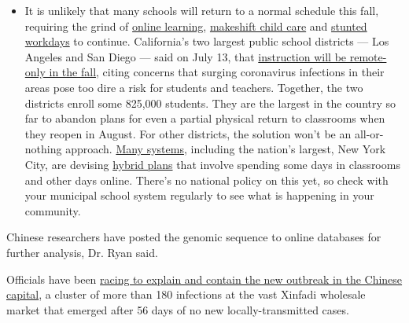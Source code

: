 \begin{itemize}
  \begin{itemize}
  \tightlist
  \item
    It is unlikely that many schools will return to a normal schedule
    this fall, requiring the grind of
    \href{https://www.nytimes3xbfgragh.onion/2020/06/05/us/coronavirus-education-lost-learning.html?action=click\&pgtype=Article\&state=default\&region=MAIN_CONTENT_3\&context=storylines_faq}{online
    learning},
    \href{https://www.nytimes3xbfgragh.onion/2020/05/29/us/coronavirus-child-care-centers.html?action=click\&pgtype=Article\&state=default\&region=MAIN_CONTENT_3\&context=storylines_faq}{makeshift
    child care} and
    \href{https://www.nytimes3xbfgragh.onion/2020/06/03/business/economy/coronavirus-working-women.html?action=click\&pgtype=Article\&state=default\&region=MAIN_CONTENT_3\&context=storylines_faq}{stunted
    workdays} to continue. California's two largest public school
    districts --- Los Angeles and San Diego --- said on July 13, that
    \href{https://www.nytimes3xbfgragh.onion/2020/07/13/us/lausd-san-diego-school-reopening.html?action=click\&pgtype=Article\&state=default\&region=MAIN_CONTENT_3\&context=storylines_faq}{instruction
    will be remote-only in the fall}, citing concerns that surging
    coronavirus infections in their areas pose too dire a risk for
    students and teachers. Together, the two districts enroll some
    825,000 students. They are the largest in the country so far to
    abandon plans for even a partial physical return to classrooms when
    they reopen in August. For other districts, the solution won't be an
    all-or-nothing approach.
    \href{https://bioethics.jhu.edu/research-and-outreach/projects/eschool-initiative/school-policy-tracker/}{Many
    systems}, including the nation's largest, New York City, are
    devising
    \href{https://www.nytimes3xbfgragh.onion/2020/06/26/us/coronavirus-schools-reopen-fall.html?action=click\&pgtype=Article\&state=default\&region=MAIN_CONTENT_3\&context=storylines_faq}{hybrid
    plans} that involve spending some days in classrooms and other days
    online. There's no national policy on this yet, so check with your
    municipal school system regularly to see what is happening in your
    community.
  \end{itemize}
\end{itemize}

Chinese researchers have posted the genomic sequence to online databases
for further analysis, Dr. Ryan said.

Officials have been
\href{https://www.nytimes3xbfgragh.onion/2020/06/17/world/asia/coronavirus-beijing-china.html}{racing
to explain and contain the new outbreak in the Chinese capital}, a
cluster of more than 180 infections at the vast Xinfadi wholesale market
that emerged after 56 days of no new locally-transmitted cases.

